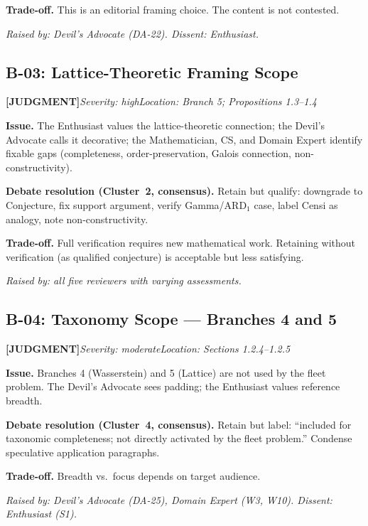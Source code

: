 \documentclass[11pt,a4paper]{article}
\newcommand{\judgmentlabel}{\textbf{\textcolor{judgmentorange}{[JUDGMENT]}}}
\begin{document}
\textbf{Trade-off.} This is an editorial framing choice. The content is not contested.

\textit{Raised by: Devil's Advocate (DA-22). Dissent: Enthusiast.}

\bigskip

\subsection{B-03: Lattice-Theoretic Framing Scope}
\judgmentlabel\quad\textit{Severity: high}\quad\textit{Location: Branch 5; Propositions 1.3--1.4}

\textbf{Issue.} The Enthusiast values the lattice-theoretic connection; the Devil's Advocate calls it decorative; the Mathematician, CS, and Domain Expert identify fixable gaps (completeness, order-preservation, Galois connection, non-constructivity).

\textbf{Debate resolution (Cluster~2, consensus).} Retain but qualify: downgrade to Conjecture, fix support argument, verify Gamma/ARD$_1$ case, label Censi as analogy, note non-constructivity.

\textbf{Trade-off.} Full verification requires new mathematical work. Retaining without verification (as qualified conjecture) is acceptable but less satisfying.

\textit{Raised by: all five reviewers with varying assessments.}

\bigskip

\subsection{B-04: Taxonomy Scope --- Branches 4 and 5}
\judgmentlabel\quad\textit{Severity: moderate}\quad\textit{Location: Sections 1.2.4--1.2.5}

\textbf{Issue.} Branches 4 (Wasserstein) and 5 (Lattice) are not used by the fleet problem. The Devil's Advocate sees padding; the Enthusiast values reference breadth.

\textbf{Debate resolution (Cluster~4, consensus).} Retain but label: ``included for taxonomic completeness; not directly activated by the fleet problem.'' Condense speculative application paragraphs.

\textbf{Trade-off.} Breadth vs.\ focus depends on target audience.

\textit{Raised by: Devil's Advocate (DA-25), Domain Expert (W3, W10). Dissent: Enthusiast (S1).}
\end{document}
